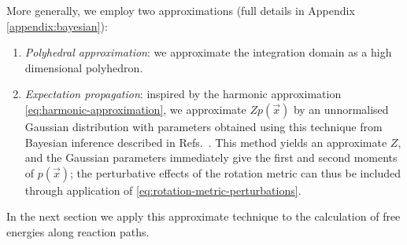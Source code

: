 \documentclass[11pt,twoside]{report}
\begin{document}
More generally, we employ two approximations (full details in Appendix \ref{appendix:bayesian}):
\begin{enumerate}
\item \emph{Polyhedral approximation}: we approximate the integration domain as a high dimensional polyhedron.
\item \emph{Expectation propagation}: inspired by the harmonic approximation \eqref{eq:harmonic-approximation}, we approximate $Z p(\vec{x})$ by an unnormalised Gaussian distribution with parameters obtained using this technique from Bayesian inference described in Refs.\ \cite{Minka2001,MinkaUAI2001,Rasmussen2006,Cunningham2011}.
  This method yields an approximate $Z$, and the Gaussian parameters immediately give the first and second moments of $p(\vec{x})$; the perturbative effects of the rotation metric can thus be included through application of \eqref{eq:rotation-metric-perturbations}.
\end{enumerate}
In the next section we apply this approximate technique to the calculation of free energies along reaction paths.


\end{document}

